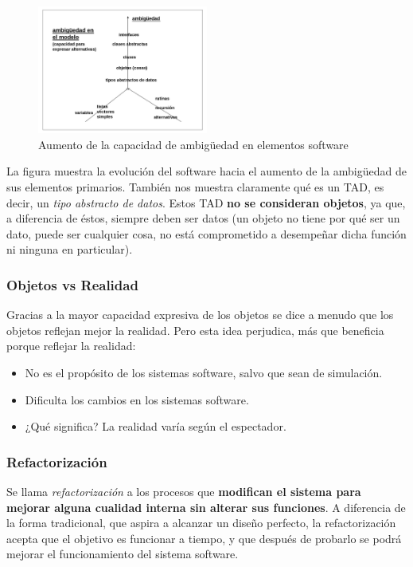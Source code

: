 \begin{figure}[ht!]  \centering
  \includegraphics[width=0.5\textwidth]{images/fig111}
  \caption{Aumento de la capacidad de ambigüedad en elementos
    software}
  \label{fig:111}
\end{figure}

La figura muestra la evolución del software hacia el aumento de la
ambigüedad de sus elementos primarios.  También nos muestra claramente
qué es un TAD, es decir, un \emph{tipo abstracto de datos}. Estos TAD
\textbf{no se consideran objetos}, ya que, a diferencia de éstos,
siempre deben ser datos (un objeto no tiene por qué ser un dato, puede
ser cualquier cosa, no está comprometido a desempeñar dicha función ni
ninguna en particular).

\subsubsection{Objetos vs Realidad} Gracias a la mayor capacidad
expresiva de los objetos se dice a menudo que los objetos reflejan
mejor la realidad.  Pero esta idea perjudica, más que beneficia porque
reflejar la realidad:
\begin{itemize}
\item No es el propósito de los sistemas software, salvo que sean de
  simulación.
\item Dificulta los cambios en los sistemas software.
\item ¿Qué significa? La realidad varía según el espectador.
\end{itemize}

\subsubsection{Refactorización}
Se llama \emph{refactorización} a los procesos que \textbf{modifican
  el sistema para mejorar alguna cualidad interna sin alterar sus
  funciones}. A diferencia de la forma tradicional, que aspira
a alcanzar un diseño perfecto, la refactorización acepta que el
objetivo es funcionar a tiempo, y que después de probarlo se podrá
mejorar el funcionamiento del sistema software.

